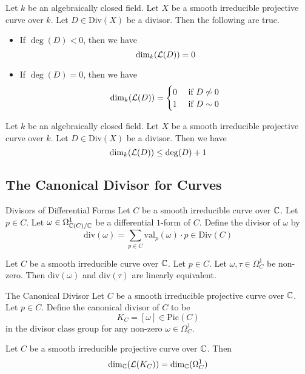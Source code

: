 \documentclass[a4paper]{article}
\begin{document}
\begin{prp}{}{} Let $k$ be an algebraically closed field. Let $X$ be a smooth irreducible projective curve over $k$. Let $D\in\text{Div}(X)$ be a divisor. Then the following are true. 
\begin{itemize}
\item If $\deg(D)<0$, then we have $$\dim_k(\mathcal{L}(D))=0$$
\item If $\deg(D)=0$, then we have $$\dim_k(\mathcal{L}(D))=\begin{cases}
0 & \text{ if }D\not\sim0\\
1 & \text{ if }D\sim 0
\end{cases}$$
\end{itemize}
\end{prp}

\begin{prp}{}{} Let $k$ be an algebraically closed field. Let $X$ be a smooth irreducible projective curve over $k$. Let $D\in\text{Div}(X)$ be a divisor. Then we have $$\dim_k(\mathcal{L}(D))\leq\deg(D)+1$$
\end{prp}

\subsection{The Canonical Divisor for Curves}
\begin{defn}{Divisors of Differential Forms}{} Let $C$ be a smooth irreducible curve over $\mathbb{C}$. Let $p\in C$. Let $\omega\in\Omega_{\mathbb{C}(C)/\mathbb{C}}^1$ be a differential $1$-form of $C$. Define the divisor of $\omega$ by $$\text{div}(\omega)=\sum_{p\in C}\text{val}_p(\omega)\cdot p\in\text{Div}(C)$$
\end{defn}

\begin{prp}{}{} Let $C$ be a smooth irreducible curve over $\mathbb{C}$. Let $p\in C$. Let $\omega,\tau\in\Omega_C^1$ be non-zero. Then $\text{div}(\omega)$ and $\text{div}(\tau)$ are linearly equivalent. 
\end{prp}

\begin{defn}{The Canonical Divisor}{} Let $C$ be a smooth irreducible projective curve over $\mathbb{C}$. Let $p\in C$. Define the canonical divisor of $C$ to be $$K_C=[\omega]\in\text{Pic}(C)$$ in the divisor class group for any non-zero $\omega\in\Omega_C^1$. 
\end{defn}

\begin{lmm}{}{} Let $C$ be a smooth irreducible projective curve over $\mathbb{C}$. Then $$\dim_{\mathbb{C}}(\mathcal{L}(K_C))=\dim_{\mathbb{C}}(\Omega_C^1)$$
\end{lmm}
\end{document}
